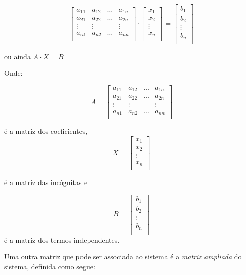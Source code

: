 \documentclass[oneside,a4paper,12pt]{article}
\begin{document}
$$
\left[
\begin{array}{cccc}
	a_{11} & a_{12} & \ldots & a_{1n} \\
	a_{21} & a_{22} & \ldots & a_{2n} \\
	\vdots & \vdots & & \vdots	 \\
	a_{n1} & a_{n2} & \ldots & a_{nn} \\
\end{array}
\right]
\cdot 
\left[
\begin{array}{c}
x_1 \\
x_2 \\
\vdots \\
x_n  \\
\end{array}
\right]
=
\left[
\begin{array}{c}
b_1 \\
b_2 \\
\vdots \\
b_n \\
\end{array}
\right]
$$

ou ainda $A\cdot X = B$

Onde:

$$ A =
\left[
\begin{array}{cccc}
a_{11} & a_{12} & \ldots & a_{1n} \\
a_{21} & a_{22} & \ldots & a_{2n} \\
\vdots & \vdots & & \vdots	 \\
a_{n1} & a_{n2} & \ldots & a_{nn} \\
\end{array}
\right]
$$

é a matriz dos coeficientes, 
$$ X =
\left[
\begin{array}{c}
	x_1 \\
	x_2 \\
	\vdots \\
	x_n  \\
\end{array}
\right]
$$

é a matriz das incógnitas e

$$ B = 
\left[
\begin{array}{c}
b_1 \\
b_2 \\
\vdots \\
b_n \\
\end{array}
\right]
$$
é a matriz dos termos independentes.

Uma outra matriz que pode ser associada ao sistema é a {\it matriz ampliada} do sistema, definida como segue:
\end{document}
